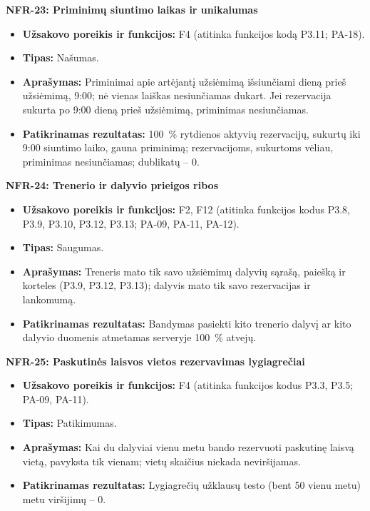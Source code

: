 \noindent\textbf{NFR-23: Priminimų siuntimo laikas ir unikalumas}
\begin{itemize}
    \item \textbf{Užsakovo poreikis ir funkcijos:} F4 (atitinka funkcijos kodą P3.11; PA-18).
    \item \textbf{Tipas:} Našumas.
    \item \textbf{Aprašymas:} Priminimai apie artėjantį užsiėmimą išsiunčiami dieną prieš užsiėmimą, 9:00; nė vienas laiškas nesiunčiamas dukart. Jei rezervacija sukurta po 9:00 dieną prieš užsiėmimą, priminimas nesiunčiamas.
    \item \textbf{Patikrinamas rezultatas:} 100~\% rytdienos aktyvių rezervacijų, sukurtų iki 9:00 siuntimo laiko, gauna priminimą; rezervacijoms, sukurtoms vėliau, priminimas nesiunčiamas; dublikatų -- 0.
\end{itemize}

\noindent\textbf{NFR-24: Trenerio ir dalyvio prieigos ribos}
\begin{itemize}
    \item \textbf{Užsakovo poreikis ir funkcijos:} F2, F12 (atitinka funkcijos kodus P3.8, P3.9, P3.10, P3.12, P3.13; PA-09, PA-11, PA-12).
    \item \textbf{Tipas:} Saugumas.
    \item \textbf{Aprašymas:} Treneris mato tik savo užsiėmimų dalyvių sąrašą, paiešką ir korteles (P3.9, P3.12, P3.13); dalyvis mato tik savo rezervacijas ir lankomumą.
    \item \textbf{Patikrinamas rezultatas:} Bandymas pasiekti kito trenerio dalyvį ar kito dalyvio duomenis atmetamas serveryje 100~\% atvejų.
\end{itemize}

\noindent\textbf{NFR-25: Paskutinės laisvos vietos rezervavimas lygiagrečiai}
\begin{itemize}
    \item \textbf{Užsakovo poreikis ir funkcijos:} F4 (atitinka funkcijos kodus P3.3, P3.5; PA-09, PA-11).
    \item \textbf{Tipas:} Patikimumas.
    \item \textbf{Aprašymas:} Kai du dalyviai vienu metu bando rezervuoti paskutinę laisvą vietą, pavyksta tik vienam; vietų skaičius niekada neviršijamas.
    \item \textbf{Patikrinamas rezultatas:} Lygiagrečių užklausų testo (bent 50 vienu metu) metu viršijimų -- 0.
\end{itemize}

